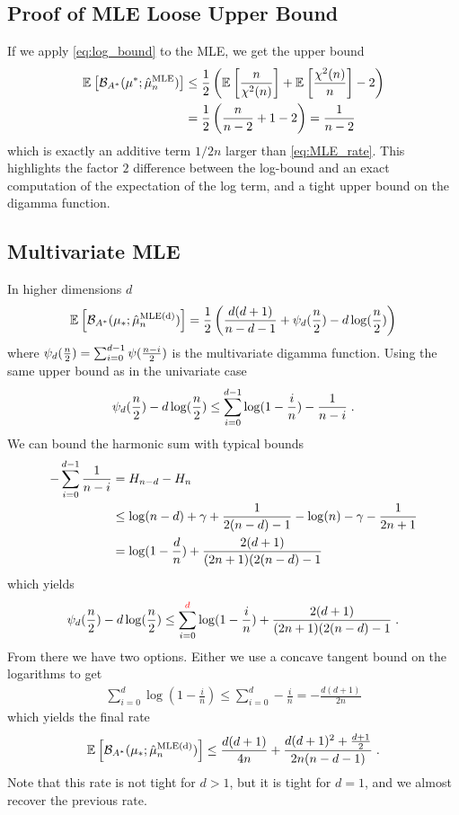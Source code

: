 \documentclass{article}
\newcommand*{\expect}[2][]{\ensuremath{\mathbb{E}_{#1} \left[ #2 \right] }} %
\newcommand{\logpart}{A}
\newcommand{\bregmanconj}{\cB_{\logpart^*}}
\newcommand{\MAPm}{\hat \mu_n}
\begin{document}
	
\subsection{Proof of MLE Loose Upper Bound}
If we apply \eqref{eq:log_bound} to the MLE, we get the upper bound
\begin{align}
	\expect{\bregmanconj(\mu^*; \MAPm^\text{MLE})}
	&\leq  \half \left( \expect{\frac{n}{\chi^2(n)}} + \expect{\frac{\chi^2(n)}{n}} - 2 \right ) \\
	&= \half \left( \frac{n}{n-2} + 1 - 2 \right)  
	= \frac{1}{n-2}
\end{align}
which is exactly  an additive term $1/2n$ larger than \eqref{eq:MLE_rate}. This highlights the factor $2$ difference between the log-bound and an exact computation of the expectation of the log term, and a tight upper bound on the digamma function.

\subsection{Multivariate MLE}
In higher dimensions $d$
 \begin{align}
 	\expect{\bregmanconj( \mu_*; \hat \mu_n^\text{MLE(d)})}
 	= \half \left ( \frac{d(d+1)}{n-d-1} + \psi_d(\half[n]) - d \log(\half[n])  \right )
 \end{align}
where $\psi_d(\half[n]) = \sum_{i=0}^{d-1} \psi ( \half[n - i])$ is the multivariate digamma function.
Using the same upper bound as in the univariate case
\begin{align}
	\psi_d(\half[n]) - d \log(\half[n]) 
	\leq \sum_{i=0}^{d-1} \log(1 - \frac{i}{n}) - \frac{1}{n-i} \; .
\end{align}
We can bound the harmonic sum with typical bounds
\begin{align}
	- \sum_{i=0}^{d-1} \frac{1}{n-i} 
	&= H_{n-d} - H_n \\
	&\leq \log(n-d) + \gamma + \inv{2(n-d) - 1} - \log(n) - \gamma - \inv{2n+1}\\
	&= \log(1-\frac{d}{n})  + \frac{2(d + 1)}{(2n+1)(2(n - d) - 1}
\end{align}
which yields 
\begin{align}
	\psi_d(\half[n]) - d \log(\half[n]) 
	\leq \sum_{i=0}^{\textcolor{red}{d}} \log(1 - \frac{i}{n})
	+ \frac{2(d + 1)}{(2n+1)(2(n - d) - 1}  \; .
\end{align}
From there we have two options. 
Either we use a concave tangent bound on the logarithms to get
\begin{align}
	\sum_{i=0}^{d} \log(1 - \frac{i}{n})
	\leq \sum_{i=0}^{d} - \frac{i}{n}
	 = -\frac{d(d+1)}{2n}
\end{align}
which yields the final rate
\begin{align}
 	\expect{\bregmanconj( \mu_*; \hat \mu_n^\text{MLE(d)})}
 	\leq \frac{d(d+1)}{4n} + \frac{d(d+1)^2 + \half[d+1]}{2 n (n - d -1)} \;.
\end{align}
Note that this rate is not tight for $d>1$, but it is tight for $d=1$, and we almost recover the previous rate.
\end{document}
